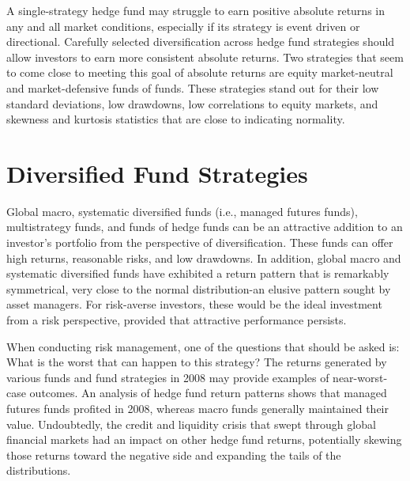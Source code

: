 \documentclass[11pt]{article}
\begin{document}
A single-strategy hedge fund may struggle to earn positive absolute returns in any and all market conditions, especially if its strategy is event driven or directional. Carefully selected diversification across hedge fund strategies should allow investors to earn more consistent absolute returns. Two strategies that seem to come close to meeting this goal of absolute returns are equity market-neutral and market-defensive funds of funds. These strategies stand out for their low standard deviations, low drawdowns, low correlations to equity markets, and skewness and kurtosis statistics that are close to indicating normality.

\section*{Diversified Fund Strategies}
Global macro, systematic diversified funds (i.e., managed futures funds), multistrategy funds, and funds of hedge funds can be an attractive addition to an investor's portfolio from the perspective of diversification. These funds can offer high returns, reasonable risks, and low drawdowns. In addition, global macro and systematic diversified funds have exhibited a return pattern that is remarkably symmetrical, very close to the normal distribution-an elusive pattern sought by asset managers. For risk-averse investors, these would be the ideal investment from a risk perspective, provided that attractive performance persists.

When conducting risk management, one of the questions that should be asked is: What is the worst that can happen to this strategy? The returns generated by various funds and fund strategies in 2008 may provide examples of near-worst-case outcomes. An analysis of hedge fund return patterns shows that managed futures funds profited in 2008, whereas macro funds generally maintained their value. Undoubtedly, the credit and liquidity crisis that swept through global financial markets had an impact on other hedge fund returns, potentially skewing those returns toward the negative side and expanding the tails of the distributions.
\end{document}
